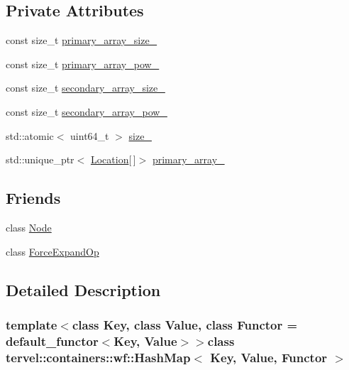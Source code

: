 \subsection*{Private Attributes}
\begin{DoxyCompactItemize}
\item 
const size\+\_\+t \hyperlink{classtervel_1_1containers_1_1wf_1_1_hash_map_a33e402d5fcf528ee13dbe5aa3f893fa2}{primary\+\_\+array\+\_\+size\+\_\+}
\item 
const size\+\_\+t \hyperlink{classtervel_1_1containers_1_1wf_1_1_hash_map_abaa36dc12509164a3c9612666a4eacbc}{primary\+\_\+array\+\_\+pow\+\_\+}
\item 
const size\+\_\+t \hyperlink{classtervel_1_1containers_1_1wf_1_1_hash_map_ac9a43fdb98927d0147a1240bd882e70b}{secondary\+\_\+array\+\_\+size\+\_\+}
\item 
const size\+\_\+t \hyperlink{classtervel_1_1containers_1_1wf_1_1_hash_map_a0db3b6f46ecf2ac2c243ee76edf0a4f5}{secondary\+\_\+array\+\_\+pow\+\_\+}
\item 
std\+::atomic$<$ uint64\+\_\+t $>$ \hyperlink{classtervel_1_1containers_1_1wf_1_1_hash_map_a88bcdcb8728735910311f62e99027385}{size\+\_\+}
\item 
std\+::unique\+\_\+ptr$<$ \hyperlink{classtervel_1_1containers_1_1wf_1_1_hash_map_ab2c04cbf19034689a795208e0108fe8a}{Location}\mbox{[}$\,$\mbox{]}$>$ \hyperlink{classtervel_1_1containers_1_1wf_1_1_hash_map_a501a15b166513ae18873d6d1d3da71a4}{primary\+\_\+array\+\_\+}
\end{DoxyCompactItemize}
\subsection*{Friends}
\begin{DoxyCompactItemize}
\item 
class \hyperlink{classtervel_1_1containers_1_1wf_1_1_hash_map_a6db9d28bd448a131448276ee03de1e6d}{Node}
\item 
class \hyperlink{classtervel_1_1containers_1_1wf_1_1_hash_map_a92fd79231cf52565db2b541bf8b96039}{Force\+Expand\+Op}
\end{DoxyCompactItemize}


\subsection{Detailed Description}
\subsubsection*{template$<$class Key, class Value, class Functor = default\+\_\+functor$<$\+Key, Value$>$$>$class tervel\+::containers\+::wf\+::\+Hash\+Map$<$ Key, Value, Functor $>$}

